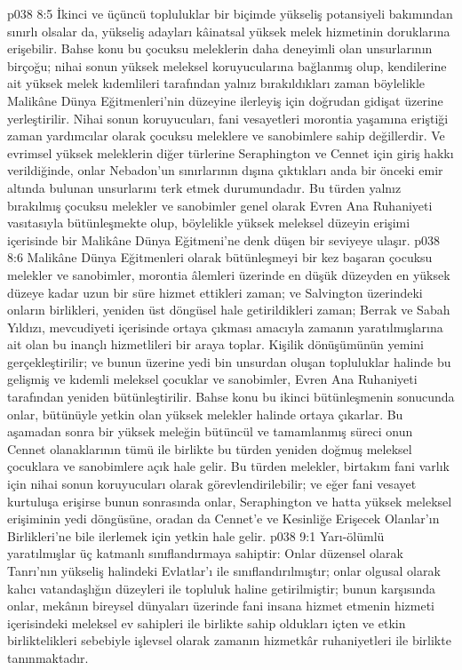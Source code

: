 \vs p038 8:5 İkinci ve üçüncü topluluklar bir biçimde yükseliş potansiyeli bakımından sınırlı olsalar da, yükseliş adayları kâinatsal yüksek melek hizmetinin doruklarına erişebilir. Bahse konu bu çocuksu meleklerin daha deneyimli olan unsurlarının birçoğu; nihai sonun yüksek meleksel koruyucularına bağlanmış olup, kendilerine ait yüksek melek kıdemlileri tarafından yalnız bırakıldıkları zaman böylelikle Malikâne Dünya Eğitmenleri’nin düzeyine ilerleyiş için doğrudan gidişat üzerine yerleştirilir. Nihai sonun koruyucuları, fani vesayetleri morontia yaşamına eriştiği zaman yardımcılar olarak çocuksu meleklere ve sanobimlere sahip değillerdir. Ve evrimsel yüksek meleklerin diğer türlerine Seraphington ve Cennet için giriş hakkı verildiğinde, onlar Nebadon’un sınırlarının dışına çıktıkları anda bir önceki emir altında bulunan unsurlarını terk etmek durumundadır. Bu türden yalnız bırakılmış çocuksu melekler ve sanobimler genel olarak Evren Ana Ruhaniyeti vasıtasıyla bütünleşmekte olup, böylelikle yüksek meleksel düzeyin erişimi içerisinde bir Malikâne Dünya Eğitmeni’ne denk düşen bir seviyeye ulaşır.
\vs p038 8:6 Malikâne Dünya Eğitmenleri olarak bütünleşmeyi bir kez başaran çocuksu melekler ve sanobimler, morontia âlemleri üzerinde en düşük düzeyden en yüksek düzeye kadar uzun bir süre hizmet ettikleri zaman; ve Salvington üzerindeki onların birlikleri, yeniden üst döngüsel hale getirildikleri zaman; Berrak ve Sabah Yıldızı, mevcudiyeti içerisinde ortaya çıkması amacıyla zamanın yaratılmışlarına ait olan bu inançlı hizmetlileri bir araya toplar. Kişilik dönüşümünün yemini gerçekleştirilir; ve bunun üzerine yedi bin unsurdan oluşan topluluklar halinde bu gelişmiş ve kıdemli meleksel çocuklar ve sanobimler, Evren Ana Ruhaniyeti tarafından yeniden bütünleştirilir. Bahse konu bu ikinci bütünleşmenin sonucunda onlar, bütünüyle yetkin olan yüksek melekler halinde ortaya çıkarlar. Bu aşamadan sonra bir yüksek meleğin bütüncül ve tamamlanmış süreci onun Cennet olanaklarının tümü ile birlikte bu türden yeniden doğmuş meleksel çocuklara ve sanobimlere açık hale gelir. Bu türden melekler, birtakım fani varlık için nihai sonun koruyucuları olarak görevlendirilebilir; ve eğer fani vesayet kurtuluşa erişirse bunun sonrasında onlar, Seraphington ve hatta yüksek meleksel erişiminin yedi döngüsüne, oradan da Cennet’e ve Kesinliğe Erişecek Olanlar’ın Birlikleri’ne bile ilerlemek için yetkin hale gelir.
\vs p038 9:1 Yarı\hyp{}ölümlü yaratılmışlar üç katmanlı sınıflandırmaya sahiptir: Onlar düzensel olarak Tanrı’nın yükseliş halindeki Evlatlar’ı ile sınıflandırılmıştır; onlar olgusal olarak kalıcı vatandaşlığın düzeyleri ile topluluk haline getirilmiştir; bunun karşısında onlar, mekânın bireysel dünyaları üzerinde fani insana hizmet etmenin hizmeti içerisindeki meleksel ev sahipleri ile birlikte sahip oldukları içten ve etkin birliktelikleri sebebiyle işlevsel olarak zamanın hizmetkâr ruhaniyetleri ile birlikte tanınmaktadır.
